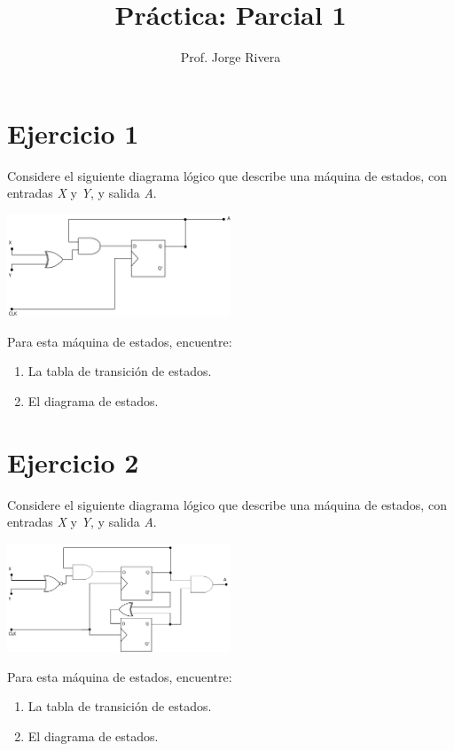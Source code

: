 \documentclass[letterpaper,12pt]{IEEEtran}
\title{Práctica: Parcial 1}
\author{Prof. Jorge Rivera}
\begin{document}
\maketitle

\section*{Ejercicio 1}

Considere el siguiente diagrama lógico que describe una máquina de estados, con entradas \textit{X} y \textit{Y}, y salida \textit{A}.

\noindent\includegraphics[width=0.5\textwidth]{FSM1}

Para esta máquina de estados, encuentre:
\begin{enumerate}
	\item La tabla de transición de estados.
	\item El diagrama de estados.
\end{enumerate}

\section*{Ejercicio 2}

Considere el siguiente diagrama lógico que describe una máquina de estados, con entradas \textit{X} y \textit{Y}, y salida \textit{A}.

\noindent\includegraphics[width=0.5\textwidth]{FSM2}

Para esta máquina de estados, encuentre:
\begin{enumerate}
	\item La tabla de transición de estados.
	\item El diagrama de estados.
\end{enumerate}

\newpage
\end{document}
